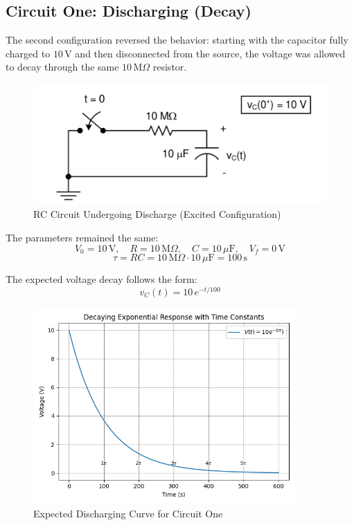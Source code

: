 \documentclass[12pt]{article}
\begin{document}
\subsection{Circuit One: Discharging (Decay)}
The second configuration reversed the behavior: starting with the capacitor fully charged to $10\,\mathrm{V}$ and then disconnected from the source, the voltage was allowed to decay through the same $10\,\mathrm{M}\Omega$ resistor.

\begin{figure}[H]
	\centering
	\includegraphics[width=14cm]{e5_2}
	\caption{RC Circuit Undergoing Discharge (Excited Configuration)}
\end{figure}

The parameters remained the same:
\[
	V_0 = 10\,\mathrm{V}, \quad R = 10\,\mathrm{M}\Omega, \quad C = 10\,\mu\mathrm{F}, \quad V_f = 0\,\mathrm{V}
\]
\[
	\tau = RC = 10\,\mathrm{M}\Omega \cdot 10\,\mu\mathrm{F} = 100\,\mathrm{s}
\]

The expected voltage decay follows the form:
\[
	v_C(t) = 10\,e^{-t/100}
\]

\begin{figure}[H]
	\centering
	\includegraphics[width=10cm]{05_exp2}
	\caption{Expected Discharging Curve for Circuit One}
	\label{fig:circuitonegraph2}
\end{figure}
\end{document}
